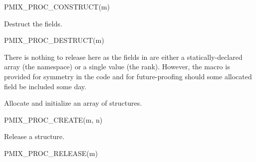 \cspecificstart
\begin{codepar}
PMIX_PROC_CONSTRUCT(m)
\end{codepar}
\cspecificend

\begin{arglist}
\end{arglist}


Destruct the  fields.

\cspecificstart
\begin{codepar}
PMIX_PROC_DESTRUCT(m)
\end{codepar}
\cspecificend

\begin{arglist}
\end{arglist}

There is nothing to release here as the fields in  are either a statically-declared array (the namespace) or a single value (the rank). However, the macro is provided for symmetry in the code and for future-proofing should some allocated field be included some day.


Allocate and initialize an array of  structures.

\cspecificstart
\begin{codepar}
PMIX_PROC_CREATE(m, n)
\end{codepar}
\cspecificend

\begin{arglist}
\end{arglist}



Release a  structure.

\cspecificstart
\begin{codepar}
PMIX_PROC_RELEASE(m)
\end{codepar}
\cspecificend

